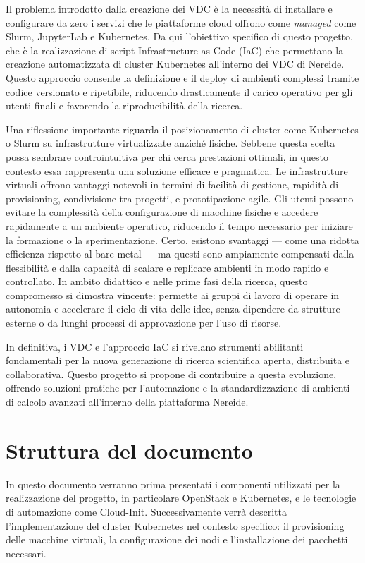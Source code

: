 \documentclass[12pt,a4paper,openright,twoside]{book}
\begin{document}
Il problema introdotto dalla creazione dei VDC è la necessità di installare e configurare da zero i servizi che le piattaforme cloud offrono come \textit{managed} come Slurm, JupyterLab e Kubernetes. 
Da qui l'obiettivo specifico di questo progetto, che è la realizzazione di script Infrastructure-as-Code (IaC) che permettano la creazione automatizzata di cluster Kubernetes all'interno dei VDC di Nereide.
Questo approccio consente la definizione e il deploy di ambienti complessi tramite codice versionato e ripetibile, riducendo drasticamente il carico operativo per gli utenti finali e favorendo la riproducibilità della ricerca.

Una riflessione importante riguarda il posizionamento di cluster come Kubernetes o Slurm su infrastrutture virtualizzate anziché fisiche.
Sebbene questa scelta possa sembrare controintuitiva per chi cerca prestazioni ottimali, in questo contesto essa rappresenta una soluzione efficace e pragmatica.
Le infrastrutture virtuali offrono vantaggi notevoli in termini di facilità di gestione, rapidità di provisioning, condivisione tra progetti, e prototipazione agile.
Gli utenti possono evitare la complessità della configurazione di macchine fisiche e accedere rapidamente a un ambiente operativo, riducendo il tempo necessario per iniziare la formazione o la sperimentazione.
Certo, esistono svantaggi — come una ridotta efficienza rispetto al bare-metal — ma questi sono ampiamente compensati dalla flessibilità e dalla capacità di scalare e replicare ambienti in modo rapido e controllato.
In ambito didattico e nelle prime fasi della ricerca, questo compromesso si dimostra vincente: permette ai gruppi di lavoro di operare in autonomia e accelerare il ciclo di vita delle idee, senza dipendere da strutture
esterne o da lunghi processi di approvazione per l'uso di risorse.

In definitiva, i VDC e l'approccio IaC si rivelano strumenti abilitanti fondamentali per la nuova generazione di ricerca scientifica aperta, distribuita e collaborativa.
Questo progetto si propone di contribuire a questa evoluzione, offrendo soluzioni pratiche per l'automazione e la standardizzazione di ambienti di calcolo avanzati all'interno della piattaforma Nereide.

\section{Struttura del documento}
In questo documento verranno prima presentati i componenti utilizzati per la realizzazione del progetto, in particolare OpenStack e Kubernetes, e le tecnologie di automazione come Cloud-Init.
Successivamente verrà descritta l'implementazione del cluster Kubernetes nel contesto specifico: il provisioning delle macchine virtuali, la configurazione dei nodi e l'installazione dei pacchetti necessari.
\end{document}

